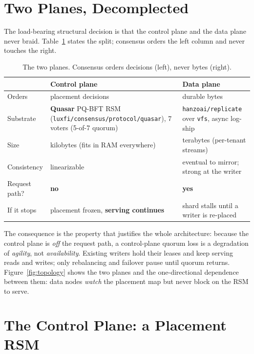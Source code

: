 \documentclass[11pt]{article}
\begin{document}
\section{Two Planes, Decomplected}
\label{sec:twoplanes}

The load-bearing structural decision is that the control plane and the data
plane never braid. Table~\ref{tab:planes} states the split; consensus orders
the left column and never touches the right.

\begin{table}[h]
\centering
\footnotesize
\caption{The two planes. Consensus orders decisions (left), never bytes (right).}
\label{tab:planes}
\begin{tabular}{@{}p{2.05cm}p{2.55cm}p{2.55cm}@{}}
\toprule
 & \textbf{Control plane} & \textbf{Data plane} \\
\midrule
Orders & placement decisions & durable bytes \\
Substrate & \textbf{Quasar} PQ-BFT RSM (\texttt{luxfi/consensus/protocol/quasar}), 7 voters (5-of-7 quorum) & \texttt{hanzoai/replicate} over \texttt{vfs}, async log-ship \\
Size & kilobytes (fits in RAM everywhere) & terabytes (per-tenant streams) \\
Consistency & linearizable & eventual to mirror; strong at the writer \\
Request path? & \textbf{no} & \textbf{yes} \\
If it stops & placement frozen, \textbf{serving continues} & shard stalls until a writer is re-placed \\
\bottomrule
\end{tabular}
\end{table}

The consequence is the property that justifies the whole architecture:
because the control plane is \emph{off} the request path, a control-plane
quorum loss is a degradation of \emph{agility}, not \emph{availability}.
Existing writers hold their leases and keep serving reads and writes; only
rebalancing and failover pause until quorum returns. Figure~\ref{fig:topology}
shows the two planes and the one-directional dependence between them: data
nodes \emph{watch} the placement map but never block on the RSM to serve.



\section{The Control Plane: a Placement RSM}
\label{sec:control}
\end{document}
